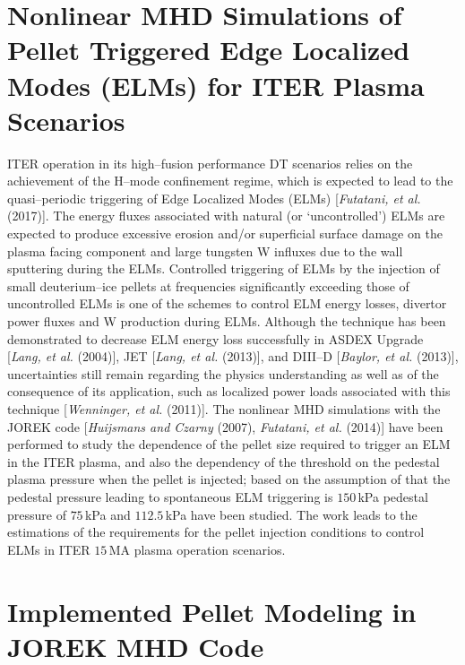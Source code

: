\documentclass[a4paper,openany,12pt]{book}
\begin{document}
{%
\section[Nonlinear MHD Simulations]{Nonlinear MHD Simulations of Pellet Triggered Edge Localized Modes (ELMs) for ITER Plasma Scenarios}

ITER operation in its high--fusion performance DT scenarios relies on the achievement of the H--mode confinement regime, which is expected to lead to the quasi--periodic triggering of Edge Localized Modes (ELMs) [\emph{Futatani, et al.} (2017)]. The energy fluxes associated with natural (or `uncontrolled') ELMs are expected to produce excessive erosion and/or superficial surface damage on the plasma facing component and large tungsten W influxes due to the wall sputtering during the ELMs. Controlled triggering of ELMs by the injection of small deuterium--ice pellets at frequencies significantly exceeding those of uncontrolled ELMs is one of the schemes to control ELM energy losses, divertor power fluxes and W production during ELMs. Although the technique has been demonstrated to decrease ELM energy loss successfully in ASDEX Upgrade [\emph{Lang, et al.} (2004)], JET [\emph{Lang, et al.} (2013)], and DIII--D [\emph{Baylor, et al.} (2013)], uncertainties still remain regarding the physics understanding as well as of the consequence of its application, such as localized power loads associated with this technique [\emph{Wenninger, et al.} (2011)]. The nonlinear MHD simulations with the JOREK code [\emph{Huijsmans and Czarny} (2007), \emph{Futatani, et al.} (2014)] have been performed to study the dependence of the pellet size required to trigger an ELM in the ITER plasma, and also the dependency of the threshold on the pedestal plasma pressure when the pellet is injected; based on the assumption of that the pedestal pressure leading to spontaneous ELM triggering is $150\,$kPa pedestal pressure of $75\,$kPa and 
$112.5\,$kPa have been studied. The work leads to the estimations of the requirements for the pellet injection conditions to control ELMs in ITER $15\,$MA plasma operation scenarios.

\section{Implemented Pellet Modeling in JOREK MHD Code}

}
\end{document}

